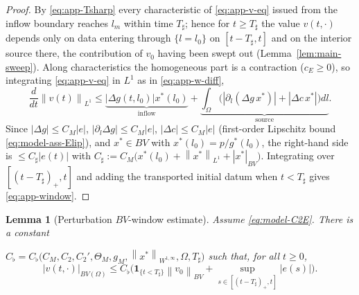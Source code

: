 \documentclass[pdflatex,sn-mathphys-num]{sn-jnl}
\theoremstyle{thmstyleone}
\newtheorem{lemma}[theorem]{Lemma}
\theoremstyle{definition}
\theoremstyle{remark}
\newcommand{\Om}{\Omega}
\newcommand{\norm}[1]{\left\lVert#1\right\rVert}
\newcommand{\abs}[1]{\left\lvert#1\right\rvert}
\numberwithin{equation}{section}
\begin{document}
\begin{proof}
By \eqref{eq:app-Tsharp} every characteristic of \eqref{eq:app-v-eq} issued from
the inflow boundary reaches $l_m$ within time $T_\sharp$; hence for $t\ge T_\sharp$
the value $v(t,\cdot)$ depends only on data entering through $\{l=l_0\}$ on
$[t-T_\sharp,t]$ and on the interior source there, the contribution of $v_0$
having been swept out (Lemma~\ref{lem:main-sweep}). Along characteristics the
homogeneous part is a contraction ($c_E\ge0$), so integrating \eqref{eq:app-v-eq}
in $L^1$ as in \eqref{eq:app-w-diff},
\[
\frac{d}{dt}\norm{v(t)}_{L^1}
\le \underbrace{\abs{\Delta g(t,l_0)}x^*(l_0)}_{\text{inflow}}
+\underbrace{\int_\Om\big(\abs{\partial_l(\Delta g\,x^*)}+\abs{\Delta c\,x^*}\big)dl}_{\text{source}} .
\]
Since $\abs{\Delta g}\le C_M\abs{e}$, $\abs{\partial_l\Delta g}\le C_M\abs{e}$,
$\abs{\Delta c}\le C_M\abs{e}$ (first-order Lipschitz bound
\eqref{eq:model-ass-Elip}), and $x^*\in BV$ with $x^*(l_0)=p/g^*(l_0)$, the
right-hand side is $\le C_\sharp\abs{e(t)}$ with
$C_\sharp:=C_M\big(x^*(l_0)+\norm{x^*}_{L^1}+\abs{x^*}_{BV}\big)$. Integrating over
$[(t-T_\sharp)_+,t]$ and adding the transported initial datum when $t<T_\sharp$
gives \eqref{eq:app-window}.
\end{proof}

\begin{lemma}[Perturbation $BV$-window estimate]
\label{lem:app-v-bv-window}
Assume \eqref{eq:model-C2E}. There is a constant \par
\noindent $C_\flat=C_\flat\big(C_M,C_2,C_2',\Theta_M,g_M,\norm{x^*}_{W^{1,\infty}},\Om,T_\sharp\big)$
such that, for all $t\ge0$,
\begin{equation}
\label{eq:app-v-bv}
\abs{v(t,\cdot)}_{BV(\Om)}
\le
C_\flat\Big(\mathbf 1_{\{t<T_\sharp\}}\norm{v_0}_{BV}
+\sup_{s\in[(t-T_\sharp)_+,t]}\abs{e(s)}\Big).
\end{equation}
\end{lemma}
\end{document}
